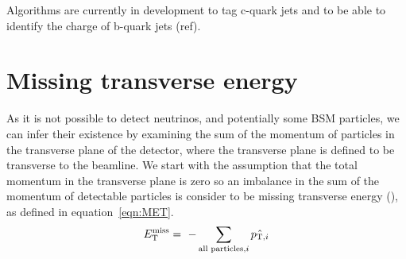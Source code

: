 Algorithms are currently in development to tag c-quark jets and to be able to identify the charge of b-quark jets (ref).

\section{Missing transverse energy ~\label{sec:METreco}}
As it is not possible to detect neutrinos, and potentially some BSM particles, we can infer their existence by examining the sum of the momentum of particles in the transverse plane of the detector, where the transverse plane is defined to be transverse to the beamline. We start with the assumption that the total momentum in the transverse plane is zero so an imbalance in the sum of the momentum of detectable particles is consider to be missing transverse energy (\ETmiss), as defined in equation~\ref{eqn:MET}.
\begin{equation}
E_{\mathrm{T}}^{\text{miss}} = ~- \sum_{\textrm{all particles,}i} \hat{ {p}_{\textrm{T},i} }
\label{eqn:MET}
\end{equation}



